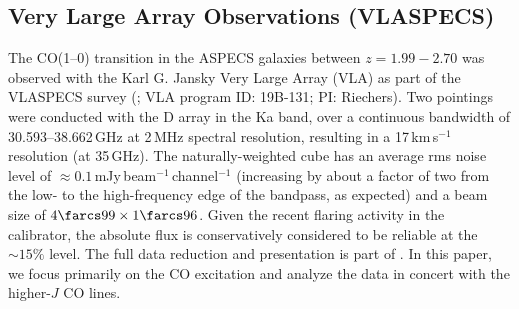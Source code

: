 \documentclass[twocolumn]{aastex62}
\begin{document}
\subsection{Very Large Array Observations (VLASPECS)}
\label{sec:vla-data-from}
The CO(1--0) transition in the ASPECS galaxies between $z=1.99 - 2.70$ was
observed with the Karl G. Jansky Very Large Array (VLA) as part of the VLASPECS
survey (\citealt{Riechers2020b}; VLA program ID: 19B-131; PI: Riechers).  Two
pointings were conducted with the D array in the Ka band, over a continuous
bandwidth of 30.593--38.662\,GHz at 2\,MHz spectral resolution, resulting in a
17\,km\,s$^{-1}$ resolution (at 35\,GHz).  The naturally-weighted cube has an
average rms noise level of $\approx 0.1$\,mJy\,beam$^{-1}$\,channel$^{-1}$
(increasing by about a factor of two from the low- to the high-frequency edge
of the bandpass, as expected) and a beam size of $4\farcs99 \times 1\farcs96$.
Given the recent flaring activity in the calibrator, the absolute flux is
conservatively considered to be reliable at the $\sim 15\%$ level.  The full
data reduction and presentation is part of \cite{Riechers2020b}.  In this paper,
we focus primarily on the CO excitation and analyze the data in concert with
the higher-$J$ CO lines.
\end{document}
